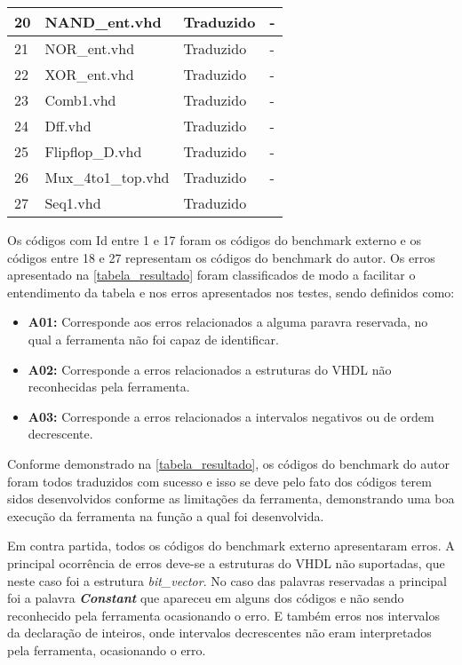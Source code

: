 \begin{table}[H]
\begin{tabular}{|l|l|l|l|}
20 & NAND\_ent.vhd      & Traduzido          & -                     \\ \hline
21 & NOR\_ent.vhd       & Traduzido          & -                     \\ \hline
22 & XOR\_ent.vhd       & Traduzido          & -                     \\ \hline
23 & Comb1.vhd          & Traduzido          & -                     \\ \hline
24 & Dff.vhd            & Traduzido          & -                     \\ \hline
25 & Flipflop\_D.vhd    & Traduzido          & -                     \\ \hline
26 & Mux\_4to1\_top.vhd & Traduzido          & -                     \\ \hline
27 & Seq1.vhd           & Traduzido          &                       \\ \hline
\end{tabular}
\end{table}

\par
Os códigos com Id entre 1 e 17 foram os códigos do benchmark externo e os códigos entre 18 e 27 representam os códigos do benchmark do autor. Os erros apresentado na \autoref{tabela_resultado} foram classificados de modo a facilitar o entendimento da tabela e nos erros apresentados nos testes, sendo definidos como:
\begin{itemize}
    \item \textbf{A01:} Corresponde aos erros relacionados a alguma paravra reservada, no qual a ferramenta não foi capaz de identificar.
    \item \textbf{A02:} Corresponde a erros relacionados a estruturas do VHDL não reconhecidas pela ferramenta.
    \item \textbf{A03:} Corresponde a erros relacionados a intervalos negativos ou de ordem decrescente.
\end{itemize}

\par
Conforme demonstrado na \autoref{tabela_resultado}, os códigos do benchmark do autor foram todos traduzidos com sucesso e isso se deve pelo fato dos códigos terem sidos desenvolvidos conforme as limitações da ferramenta, demonstrando uma boa execução da ferramenta na função a qual foi desenvolvida.

\par
Em contra partida, todos os códigos do benchmark externo apresentaram erros. A principal ocorrência de erros deve-se a estruturas do VHDL não suportadas, que neste caso foi a estrutura \textit{bit\_vector}. No caso das palavras reservadas a principal foi a palavra \textbf{\textit{Constant}} que apareceu em alguns dos códigos e não sendo reconhecido pela ferramenta ocasionando o erro. E também erros nos intervalos da declaração de inteiros, onde intervalos decrescentes não eram interpretados pela ferramenta, ocasionando o erro.

\par
